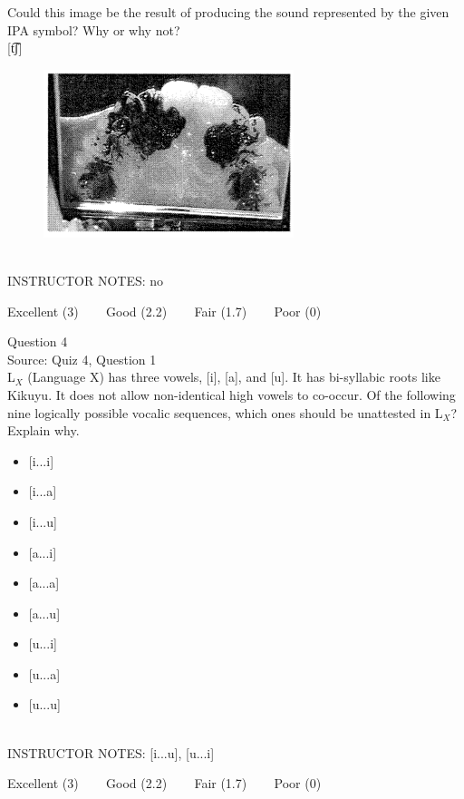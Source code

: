 \documentclass[12pt]{article}
\begin{document}
Could this image be the result of producing the sound represented by the given IPA symbol? Why or why not?\\

{[t͡ʃ]}

\begin{figure}[H]
\includegraphics{../images/staticpalatography_fricative.png}
\end{figure}

~\\
INSTRUCTOR NOTES: no


\vfill
Excellent (3) ~~~ Good (2.2) ~~~ Fair (1.7) ~~~ Poor (0)
\newpage

{\large Question 4}\\

Source: Quiz 4, Question 1\\

L$_X$ (Language X) has three vowels, [i], [a], and [u]. It has bi-syllabic roots like Kikuyu. It does not allow non-identical high vowels to co-occur. Of the following nine logically possible vocalic sequences, which ones should be unattested in L$_X$? Explain why.\\

\begin{itemize} \item {[i...i]} \item {[i...a]} \item {[i...u]} \item {[a...i]} \item {[a...a]} \item {[a...u]} \item {[u...i]} \item {[u...a]} \item {[u...u]} \end{itemize}


~\\
INSTRUCTOR NOTES: [i...u], [u...i]


\vfill
Excellent (3) ~~~ Good (2.2) ~~~ Fair (1.7) ~~~ Poor (0)
\newpage
\end{document}
